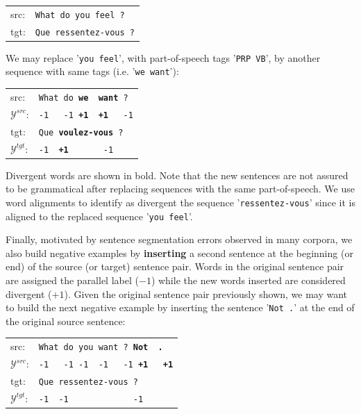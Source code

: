\documentclass[11pt,a4paper]{article}
\begin{document}
\begin{table}[h]
\begin{tabular}{ll}
src: & { \small \texttt{What do you feel ?}} \\
tgt: & { \small \texttt{Que ressentez-vous ?}} \\
\end{tabular}
\end{table}

We may replace '\texttt{you feel}', with part-of-speech tags '\texttt{PRP VB}', by another sequence with same tags (i.e. '\texttt{we want}'):

\begin{table}[h]
\begin{tabular}{ll}
src: & { \small \texttt{What do {\bf we \ want} ?}} \\
$\mathcal{Y}^{src}$: & { \small \texttt{-1 \ \  -1 {\bf +1\ \ +1} \ \  -1}} \\
tgt: & { \small \texttt{Que {\bf voulez-vous} ?}} \\
$\mathcal{Y}^{tgt}$: & { \small \texttt{-1\ \ {\bf +1}\ \ \ \ \ \ \ -1}} \\
\end{tabular}
\end{table}

Divergent words are shown in bold. 
Note that the new sentences are not assured to be grammatical after replacing sequences with the same part-of-speech.
We use word alignments to identify as divergent the sequence '\texttt{ressentez-vous}' since it is aligned to the replaced sequence '\texttt{you feel}'.

Finally, motivated by sentence segmentation errors observed in many corpora, we also build negative examples by {\bf inserting} a second sentence at the beginning (or end) of the source (or target) sentence pair. 
Words in the original sentence pair are assigned the parallel label ($-1$) while the new words inserted are considered divergent ($+1$).
Given the original sentence pair previously shown, we may want to build the next negative example by inserting the sentence '\texttt{Not .}' at the end of the original source sentence:

\begin{table}[h]
\begin{tabular}{ll}
src: & { \small \texttt{What do you want ? {\bf Not \ .}}} \\
$\mathcal{Y}^{src}$: & { \small \texttt{-1 \ \  -1 -1 \ -1  \ \ -1 {\bf +1\ \ \  +1}}} \\
tgt: & { \small \texttt{Que ressentez-vous ?}} \\
$\mathcal{Y}^{tgt}$: & { \small \texttt{-1\ \ -1\ \ \ \ \ \ \ \ \ \ \ \ \ -1}} \\
\end{tabular}
\end{table}
\end{document}
